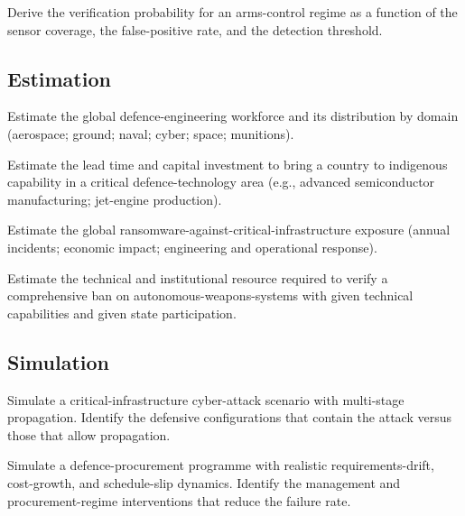 \begin{exercise}
Derive the verification probability for an arms-control regime as a function of the sensor coverage, the false-positive rate, and the detection threshold.
\end{exercise}

\subsection*{Estimation}

\begin{exercise}
Estimate the global defence-engineering workforce and its distribution by domain (aerospace; ground; naval; cyber; space; munitions).
\end{exercise}

\begin{exercise}
Estimate the lead time and capital investment to bring a country to indigenous capability in a critical defence-technology area (e.g., advanced semiconductor manufacturing; jet-engine production).
\end{exercise}

\begin{exercise}
Estimate the global ransomware-against-critical-infrastructure exposure (annual incidents; economic impact; engineering and operational response).
\end{exercise}

\begin{exercise}
Estimate the technical and institutional resource required to verify a comprehensive ban on autonomous-weapons-systems with given technical capabilities and given state participation.
\end{exercise}

\subsection*{Simulation}

\begin{exercise}
Simulate a critical-infrastructure cyber-attack scenario with multi-stage propagation. Identify the defensive configurations that contain the attack versus those that allow propagation.
\end{exercise}

\begin{exercise}
Simulate a defence-procurement programme with realistic requirements-drift, cost-growth, and schedule-slip dynamics. Identify the management and procurement-regime interventions that reduce the failure rate.
\end{exercise}

